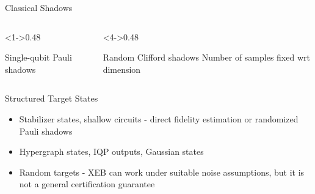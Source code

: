 \begin{frame}{Classical Shadows}
    \begin{columns}[T,onlytextwidth]
        \begin{column}<1->{0.48\textwidth}
            \begin{center}
                \makebox[0pt][c]{\hspace*{-2.5cm}\resizebox{0.95\linewidth}{!}{}}
            \end{center}

            \vspace{0.4em}
            \begin{block}{Single-qubit Pauli shadows}

            \end{block}
        \end{column}
        \begin{column}<4->{0.48\textwidth}
            \begin{center}
                \makebox[0pt][c]{\hspace*{-2.5cm}\resizebox{0.95\linewidth}{!}{}}
            \end{center}

            \vspace{0.4em}
            \begin{block}{Random Clifford shadows}
                Number of samples fixed wrt dimension

            \end{block}
        \end{column}
    \end{columns}
\end{frame}

\begin{frame}{Structured Target States}
    \begin{itemize}
        \item Stabilizer states, shallow circuits - direct fidelity estimation or randomized Pauli shadows
        \pause
        \item Hypergraph states, IQP outputs, Gaussian states
        \pause
        \item Random targets - XEB can work under suitable noise assumptions, but it is not a general certification guarantee
    \end{itemize}

    \vspace{0.4em}
    \begin{center}
        \resizebox{0.58\textwidth}{!}{}
    \end{center}
\end{frame}

